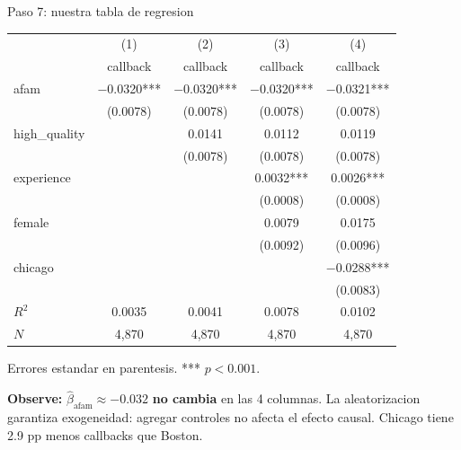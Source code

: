 \documentclass[aspectratio=169, 11pt]{beamer}
\begin{document}
\begin{frame}{Paso 7: nuestra tabla de regresion}
\footnotesize
\begin{center}
\scriptsize
\renewcommand{\arraystretch}{1.2}
\begin{tabular}{lcccc}
\toprule
& (1) & (2) & (3) & (4) \\
& callback & callback & callback & callback \\
\midrule
afam & $-$0.0320*** & $-$0.0320*** & $-$0.0320*** & $-$0.0321*** \\
& (0.0078) & (0.0078) & (0.0078) & (0.0078) \\[3pt]
high\_quality & & 0.0141 & 0.0112 & 0.0119 \\
& & (0.0078) & (0.0078) & (0.0078) \\[3pt]
experience & & & 0.0032*** & 0.0026*** \\
& & & (0.0008) & (0.0008) \\[3pt]
female & & & 0.0079 & 0.0175 \\
& & & (0.0092) & (0.0096) \\[3pt]
chicago & & & & $-$0.0288*** \\
& & & & (0.0083) \\
\midrule
$R^2$ & 0.0035 & 0.0041 & 0.0078 & 0.0102 \\
$N$ & 4{,}870 & 4{,}870 & 4{,}870 & 4{,}870 \\
\bottomrule
\end{tabular}
\end{center}
\footnotesize Errores estandar en parentesis. *** $p < 0.001$.

\vspace{0.1cm}
\tiny \textbf{Observe:} $\hat{\beta}_{\text{afam}} \approx -0.032$ \textbf{no cambia} en las 4 columnas. La aleatorizacion garantiza exogeneidad: agregar controles no afecta el efecto causal. Chicago tiene 2.9 pp menos callbacks que Boston.
\end{frame}
\end{document}
